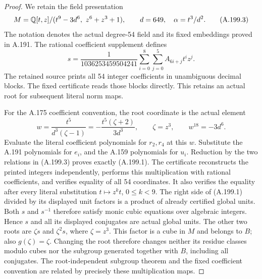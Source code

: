 \begin{proof}
We retain the field presentation
\[
 M=\mathbb Q[t,z]/(t^9-3d^6,\ z^6+z^3+1),
 \qquad d=649,\quad \alpha=t^3/d^2.
\tag{A.199.3}
\]
The notation denotes the actual degree-54 field and its
fixed embeddings proved in A.191.  The rational coefficient
supplement defines
\[
 s=\frac1{1036253459504241}
       \sum_{i=0}^{8}\sum_{j=0}^{5}A_{6i+j}t^iz^j.
\tag{A.199.4}
\]
The retained source
prints all 54 integer coefficients in unambiguous decimal
blocks.  The fixed certificate reads those blocks directly.
This retains an actual root for subsequent literal norm maps.

For the A.175 coefficient convention, the root coordinate
is the actual element
\[
 w=\frac{t^5}{d^3(\zeta-1)}
     =-\frac{t^5(\zeta+2)}{3d^3},
 \qquad \zeta=z^3,
 \qquad w^{18}=-3d^6.
\tag{A.199.5}
\]
Evaluate the literal coefficient polynomials for \(r_2,r_4\)
at this \(w\).  Substitute the A.191 polynomials for
\(e_i\), and the A.159 polynomials for \(u_i\).
Reduction by the two relations in (A.199.3) proves exactly
(A.199.1).  The certificate reconstructs the printed
integers independently, performs this multiplication with
rational coefficients, and verifies equality of all 54
coordinates.  It also verifies the equality after every
literal substitution \(t\mapsto z^kt\), \(0\leq k<9\).
The right side of (A.199.1) divided by its displayed unit
factors is a product of already certified global units.
Both \(s\) and \(s^{-1}\) therefore satisfy monic cubic
equations over algebraic integers.  Hence \(s\) and all
its displayed conjugates are actual global units.
The other two roots are \(\zeta s\) and \(\zeta^2s\),
where \(\zeta=z^3\).  This factor is a cube in \(M\)
and belongs to \(B\); also \(g(\zeta)=\zeta\).
Changing the root therefore changes neither its residue
classes modulo cubes nor the subgroup generated together
with \(B\), including all conjugates.  The root-independent
subgroup theorem and the fixed coefficient convention are
related by precisely these multiplication maps.


\end{proof}
